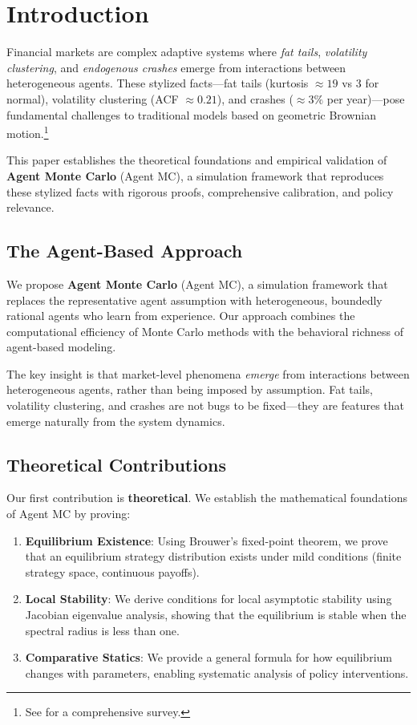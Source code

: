 \section{Introduction}
\label{sec:introduction}

Financial markets are complex adaptive systems where \textit{fat tails}, \textit{volatility clustering}, and \textit{endogenous crashes} emerge from interactions between heterogeneous agents. These stylized facts---fat tails (kurtosis $\approx 19$ vs 3 for normal), volatility clustering (ACF $\approx 0.21$), and crashes ($\approx 3\%$ per year)---pose fundamental challenges to traditional models based on geometric Brownian motion.\footnote{See \citet{cont2001empirical} for a comprehensive survey.}

This paper establishes the theoretical foundations and empirical validation of \textbf{Agent Monte Carlo} (Agent MC), a simulation framework that reproduces these stylized facts with rigorous proofs, comprehensive calibration, and policy relevance.

\subsection{The Agent-Based Approach}

We propose \textbf{Agent Monte Carlo} (Agent MC), a simulation framework that replaces the representative agent assumption with heterogeneous, boundedly rational agents who learn from experience. Our approach combines the computational efficiency of Monte Carlo methods with the behavioral richness of agent-based modeling.

The key insight is that market-level phenomena \textit{emerge} from interactions between heterogeneous agents, rather than being imposed by assumption. Fat tails, volatility clustering, and crashes are not bugs to be fixed---they are features that emerge naturally from the system dynamics.

\subsection{Theoretical Contributions}

Our first contribution is \textbf{theoretical}. We establish the mathematical foundations of Agent MC by proving:

\begin{enumerate}
    \item \textbf{Equilibrium Existence}: Using Brouwer's fixed-point theorem, we prove that an equilibrium strategy distribution exists under mild conditions (finite strategy space, continuous payoffs).
    
    \item \textbf{Local Stability}: We derive conditions for local asymptotic stability using Jacobian eigenvalue analysis, showing that the equilibrium is stable when the spectral radius is less than one.
    
    \item \textbf{Comparative Statics}: We provide a general formula for how equilibrium changes with parameters, enabling systematic analysis of policy interventions.
\end{enumerate}

